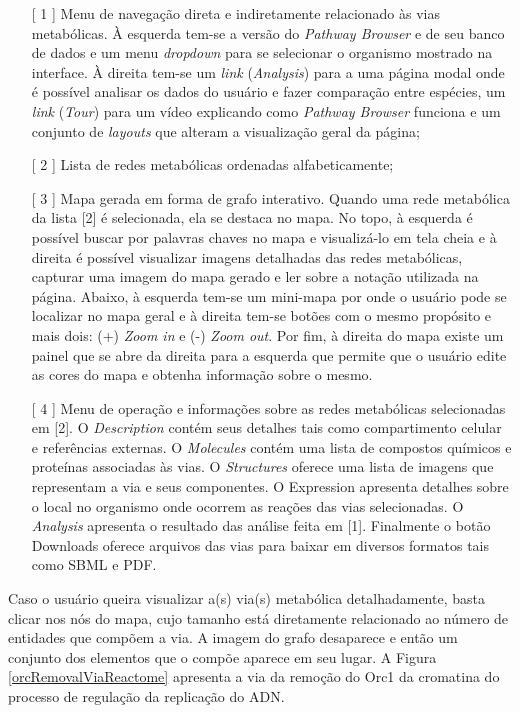\begin{itemize}
\item[[ 1]] Menu de navegação direta e indiretamente relacionado às vias metabólicas. À esquerda tem-se a versão do \textit{Pathway Browser} e de seu banco de dados e um menu \textit{dropdown} para se selecionar o organismo mostrado na interface. À direita tem-se um \textit{link} (\textit{Analysis}) para a uma página modal onde é possível analisar os dados do usuário e fazer comparação entre espécies, um \textit{link} (\textit{Tour}) para um vídeo explicando como \textit{Pathway Browser} funciona e um conjunto de \textit{layouts} que alteram a visualização geral da página;
\item[[ 2]] Lista de redes metabólicas ordenadas alfabeticamente;
\item[[ 3]] Mapa gerada em forma de grafo interativo. Quando uma rede metabólica da lista [2] é selecionada, ela se destaca no mapa. No topo, à esquerda é possível buscar por palavras chaves no mapa e visualizá-lo em tela cheia e à direita é possível visualizar imagens detalhadas das redes metabólicas, capturar uma imagem do mapa gerado e ler sobre a notação utilizada na página. Abaixo, à esquerda tem-se um mini-mapa por onde o usuário pode se localizar no mapa geral e à direita tem-se botões com o mesmo propósito e mais dois: (+) \textit{Zoom in} e (-) \textit{Zoom out}. Por fim, à direita do mapa existe um painel que se abre da direita para a esquerda que permite que o usuário edite as cores do mapa e obtenha informação sobre o mesmo.
\item[[ 4]] Menu de operação e informações sobre as redes metabólicas selecionadas em [2]. O \textit{Description} contém seus detalhes tais como compartimento celular e referências externas. O \textit{Molecules} contém uma lista de compostos químicos e proteínas associadas às vias. O \textit{Structures} oferece uma lista de imagens que representam a via e seus componentes. O Expression apresenta detalhes sobre o local no organismo onde ocorrem as reações das vias selecionadas. O \textit{Analysis} apresenta o resultado das análise feita em [1]. Finalmente o botão Downloads oferece arquivos das vias para baixar em diversos formatos tais como SBML e PDF. 
\end{itemize}

\indent Caso o usuário queira visualizar a(s) via(s) metabólica detalhadamente, basta clicar nos nós do mapa, cujo tamanho está diretamente relacionado ao número de entidades que compõem a via. A imagem do grafo desaparece e então um conjunto dos elementos que o compõe aparece em seu lugar. A Figura \ref{orcRemovalViaReactome} apresenta a via da remoção do Orc1 da cromatina do processo de regulação da replicação do ADN.


